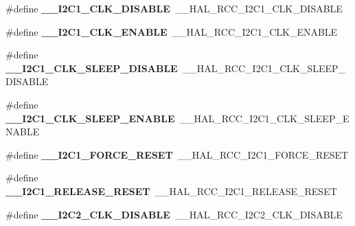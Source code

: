 \begin{DoxyCompactItemize}
\#define {\bfseries \+\_\+\+\_\+\+I2\+C1\+\_\+\+C\+L\+K\+\_\+\+D\+I\+S\+A\+B\+LE}~\+\_\+\+\_\+\+H\+A\+L\+\_\+\+R\+C\+C\+\_\+\+I2\+C1\+\_\+\+C\+L\+K\+\_\+\+D\+I\+S\+A\+B\+LE
\item 
\mbox{\label{group___h_a_l___r_c_c___aliased_ga57473cd6a4f76fedbac6dae08c8c6e78}} 
\#define {\bfseries \+\_\+\+\_\+\+I2\+C1\+\_\+\+C\+L\+K\+\_\+\+E\+N\+A\+B\+LE}~\+\_\+\+\_\+\+H\+A\+L\+\_\+\+R\+C\+C\+\_\+\+I2\+C1\+\_\+\+C\+L\+K\+\_\+\+E\+N\+A\+B\+LE
\item 
\mbox{\label{group___h_a_l___r_c_c___aliased_ga7bbdc41f3b1b13f8fe2a9c090050ed7f}} 
\#define {\bfseries \+\_\+\+\_\+\+I2\+C1\+\_\+\+C\+L\+K\+\_\+\+S\+L\+E\+E\+P\+\_\+\+D\+I\+S\+A\+B\+LE}~\+\_\+\+\_\+\+H\+A\+L\+\_\+\+R\+C\+C\+\_\+\+I2\+C1\+\_\+\+C\+L\+K\+\_\+\+S\+L\+E\+E\+P\+\_\+\+D\+I\+S\+A\+B\+LE
\item 
\mbox{\label{group___h_a_l___r_c_c___aliased_gae34832665142d53a98bf833c9f9558b8}} 
\#define {\bfseries \+\_\+\+\_\+\+I2\+C1\+\_\+\+C\+L\+K\+\_\+\+S\+L\+E\+E\+P\+\_\+\+E\+N\+A\+B\+LE}~\+\_\+\+\_\+\+H\+A\+L\+\_\+\+R\+C\+C\+\_\+\+I2\+C1\+\_\+\+C\+L\+K\+\_\+\+S\+L\+E\+E\+P\+\_\+\+E\+N\+A\+B\+LE
\item 
\mbox{\label{group___h_a_l___r_c_c___aliased_gae84da6d623ad78feba69961ea4f776bf}} 
\#define {\bfseries \+\_\+\+\_\+\+I2\+C1\+\_\+\+F\+O\+R\+C\+E\+\_\+\+R\+E\+S\+ET}~\+\_\+\+\_\+\+H\+A\+L\+\_\+\+R\+C\+C\+\_\+\+I2\+C1\+\_\+\+F\+O\+R\+C\+E\+\_\+\+R\+E\+S\+ET
\item 
\mbox{\label{group___h_a_l___r_c_c___aliased_gae58af756d3706dcb17376b4674e70ed8}} 
\#define {\bfseries \+\_\+\+\_\+\+I2\+C1\+\_\+\+R\+E\+L\+E\+A\+S\+E\+\_\+\+R\+E\+S\+ET}~\+\_\+\+\_\+\+H\+A\+L\+\_\+\+R\+C\+C\+\_\+\+I2\+C1\+\_\+\+R\+E\+L\+E\+A\+S\+E\+\_\+\+R\+E\+S\+ET
\item 
\mbox{\label{group___h_a_l___r_c_c___aliased_ga4035dd0ee6f7b6386fd8531181786c97}} 
\#define {\bfseries \+\_\+\+\_\+\+I2\+C2\+\_\+\+C\+L\+K\+\_\+\+D\+I\+S\+A\+B\+LE}~\+\_\+\+\_\+\+H\+A\+L\+\_\+\+R\+C\+C\+\_\+\+I2\+C2\+\_\+\+C\+L\+K\+\_\+\+D\+I\+S\+A\+B\+LE
\item 

\end{DoxyCompactItemize}
